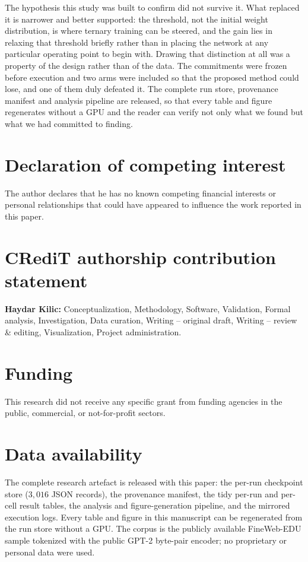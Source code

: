 \documentclass[final,5p,times,twocolumn]{elsarticle}
\theoremstyle{remark}
\begin{document}
The hypothesis this study was built to confirm did not survive it. What
replaced it is narrower and better supported: the threshold, not the initial
weight distribution, is where ternary training can be steered, and the gain
lies in relaxing that threshold briefly rather than in placing the network at
any particular operating point to begin with. Drawing that distinction at all
was a property of the design rather than of the data. The commitments were
frozen before execution and two arms were included so that the proposed method
could lose, and one of them duly defeated it.
The complete run store, provenance manifest and analysis pipeline are released,
so that every table and figure regenerates without a GPU and the reader can
verify not only what we found but what we had committed to finding.


\section*{Declaration of competing interest}
The author declares that he has no known competing financial interests or
personal relationships that could have appeared to influence the work reported
in this paper.

\section*{CRediT authorship contribution statement}
\textbf{Haydar Kilic:} Conceptualization, Methodology, Software, Validation,
Formal analysis, Investigation, Data curation, Writing -- original draft,
Writing -- review \& editing, Visualization, Project administration.

\section*{Funding}
This research did not receive any specific grant from funding agencies in the
public, commercial, or not-for-profit sectors.

\section*{Data availability}
The complete research artefact is released with this paper: the per-run
checkpoint store ($3{,}016$ JSON records), the provenance manifest, the tidy
per-run and per-cell result tables, the analysis and figure-generation
pipeline, and the mirrored execution logs. Every table and figure in this
manuscript can be regenerated from the run store without a GPU. The corpus is
the publicly available FineWeb-EDU sample tokenized with the public GPT-2
byte-pair encoder; no proprietary or personal data were used.
\end{document}
